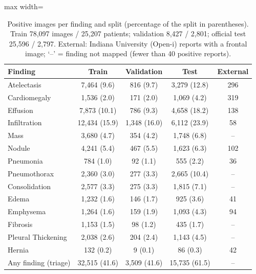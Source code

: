\begin{table}[H]\centering
\footnotesize
\caption{Positive images per finding and split (percentage of the split in parentheses). Train 78,097 images / 25,207 patients; validation 8,427 / 2,801; official test 25,596 / 2,797. External: Indiana University (Open-i) reports with a frontal image; `--' = finding not mapped (fewer than 40 positive reports).}\label{tab:dataset}
\begin{adjustbox}{max width=\linewidth}
\begin{tabular}{lcccc}
\toprule
Finding & Train & Validation & Test & External \\
\midrule
Atelectasis & 7,464 (9.6) & 816 (9.7) & 3,279 (12.8) & 296 \\
Cardiomegaly & 1,536 (2.0) & 171 (2.0) & 1,069 (4.2) & 319 \\
Effusion & 7,873 (10.1) & 786 (9.3) & 4,658 (18.2) & 138 \\
Infiltration & 12,434 (15.9) & 1,348 (16.0) & 6,112 (23.9) & 58 \\
Mass & 3,680 (4.7) & 354 (4.2) & 1,748 (6.8) & -- \\
Nodule & 4,241 (5.4) & 467 (5.5) & 1,623 (6.3) & 102 \\
Pneumonia & 784 (1.0) & 92 (1.1) & 555 (2.2) & 36 \\
Pneumothorax & 2,360 (3.0) & 277 (3.3) & 2,665 (10.4) & -- \\
Consolidation & 2,577 (3.3) & 275 (3.3) & 1,815 (7.1) & -- \\
Edema & 1,232 (1.6) & 146 (1.7) & 925 (3.6) & 41 \\
Emphysema & 1,264 (1.6) & 159 (1.9) & 1,093 (4.3) & 94 \\
Fibrosis & 1,153 (1.5) & 98 (1.2) & 435 (1.7) & -- \\
Pleural Thickening & 2,038 (2.6) & 204 (2.4) & 1,143 (4.5) & -- \\
Hernia & 132 (0.2) & 9 (0.1) & 86 (0.3) & 42 \\
Any finding (triage) & 32,515 (41.6) & 3,509 (41.6) & 15,735 (61.5) & -- \\
\bottomrule
\end{tabular}
\end{adjustbox}
\end{table}
